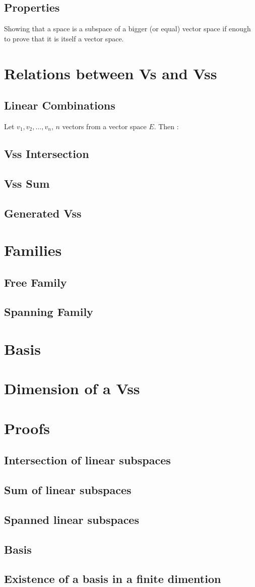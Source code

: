 \documentclass[notitlepage]{math}
\begin{document}
\subsection{Properties}
Showing that a space is a subspace of a bigger (or equal) vector space if enough to prove that it is itself a vector space.
\section{Relations between Vs and Vss}
\subsection{Linear Combinations}
Let $v_1,v_2,...,v_n$, $n$ vectors from a vector space $E$. Then :\\


\subsection{Vss Intersection}
\subsection{Vss Sum}
\subsection{Generated Vss}
\section{Families}
\subsection{Free Family}
\subsection{Spanning Family}
\section{Basis}
\section{Dimension of a Vss}
\section{Proofs}
\subsection{Intersection of linear subspaces}
\subsection{Sum of linear subspaces}
\subsection{Spanned linear subspaces}
\subsection{Basis}
\subsection{Existence of a basis in a finite dimention}
\end{document}
